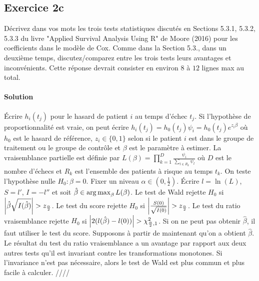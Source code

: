 \documentclass[../main.tex]{subfiles}
\begin{document}
\begin{CJK*}{UTF8}{gbsn}
\section*{Exercice 2c}

Décrivez dans vos mots les trois tests statistiques discutés en Sections 5.3.1, 5.3.2,
5.3.3 du livre "Applied Survival Analysis Using R" de Moore (2016) pour les coefficients dans le modèle de Cox. 
Comme dans la Section 5.3., dans un deuxième temps, discutez/comparez entre les trois tests leurs avantages et
inconvénients. Cette réponse devrait consister en environ $8$ à $12$ lignes max au total.

\smallskip
\paragraph{Solution}

Écrire $h_i(t_j)$ pour le hasard de patient $i$ au temps d'échec $t_j$.
Si l'hypothèse de proportionnalité est vraie,
on peut écrire $h_i(t_j) = h_0(t_j) \psi_i = h_0(t_j) e^{z_i \beta}$
où $h_0$ est le hasard de référence, $z_i \in \{0, 1\}$ selon 
si le patient $i$ est dans le groupe de traitement ou le groupe de contrôle
et $\beta$ est le paramètre à estimer. 
La vraisemblance partielle est définie par 
$L(\beta) = \prod_{k=1}^D \frac{\psi_i}{\sum_{l \in R_k} \psi_l} $
où $D$ est le nombre d'échecs et $R_k$ est l'ensemble des patients à risque au temps $t_k$.
On teste l'hypothèse nulle $H_0 : \beta = 0$.
Fixer un niveau $\alpha \in (0, \frac{1}{2})$.
Écrire $l = \ln (L)$, $S = l'$, $I = - l''$ et soit $\hat{\beta} \in \operatorname*{arg\,max}_{\beta} L(\beta)$.
Le test de Wald rejette $H_0$ si $\abs{\hat{\beta} \sqrt{I(\hat{\beta})} } > z_{\frac{\alpha}{2}}$.
Le test du score rejette $H_0$ si $\abs{\frac{S(0)}{\sqrt{I(0)}}} > z_{\frac{\alpha}{2}}$.
Le test du ratio vraisemblance rejette $H_0$ si $\abs{2(l(\hat{\beta})-l(0))} > \chi^2_{\frac{\alpha}{2},1}$.
Si on ne peut pas obtenir $\hat{\beta}$, il faut utiliser le test du score.
Supposons à partir de maintenant qu'on a obtient $\hat{\beta}$.
Le résultat du test du ratio vraisemblance a un avantage par rapport aux deux autres tests
qu'il est invariant contre les transformations monotones.
Si l'invariance n'est pas nécessaire, alors le test de Wald est plus commun et plus facile à calculer. ////

\end{CJK*}
\end{document}
